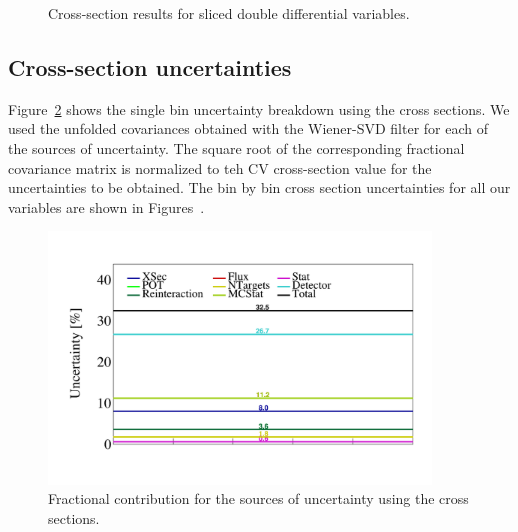 \documentclass{article}
\begin{document}
\begin{figure}
    \caption{Cross-section results for sliced double differential variables.}
    \label{fig:cross-section-double-differential}
\end{figure}

\clearpage

\subsection{Cross-section uncertainties}\label{sec:cross-section-uncertainties}

Figure~\ref{fig:single-bin-uncertainties-cross-sections} shows the single bin uncertainty breakdown 
using the cross sections. We used the unfolded covariances obtained with the Wiener-SVD filter 
for each of the sources of uncertainty. The square root of the corresponding fractional covariance 
matrix is normalized to teh CV cross-section value for the uncertainties to be obtained.
The bin by bin cross section uncertainties for all our variables are shown in
Figures~.

\begin{figure}[H]
    \centering 
    \includegraphics[width=4in]{../Figs/CAFAna/UnfBinUncertainties/EventCount.png}
    \caption{Fractional contribution for the sources of uncertainty using the cross sections.}
    \label{fig:single-bin-uncertainties-cross-sections}
\end{figure}
\end{document}
